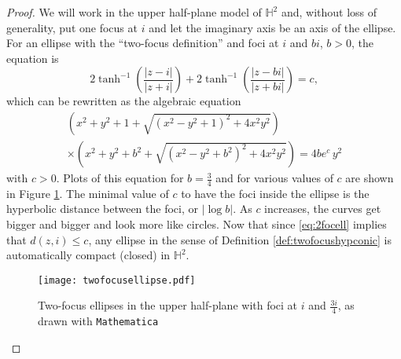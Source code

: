 \documentclass[12pt]{amsart}
\theoremstyle{definition}
\begin{document}
\begin{proof}
We will work in the upper half-plane model of ${\mathbb H}^2$ and, without
loss of generality, put one focus at $i$ and let the imaginary axis be
an axis of the ellipse.  For an ellipse with the ``two-focus
definition'' and foci at $i$ and $bi$, $b>0$, the equation is
\[
2\tanh^{-1}\left({\frac{|z-i|}{|z+i|}}\right) +
2\tanh^{-1}\left({\frac{|z-bi|}{|z+bi|}}\right) = c,
\]
which can be rewritten as the algebraic equation
\begin{multline}
\label{eq:2focell}
\left(x^2+y^2+1+\sqrt{(x^2 - y^2 + 1)^2 + 4 x^2 y^2}\right)\\
\times \left(x^2+y^2+b^2+\sqrt{(x^2 - y^2 + b^2)^2 + 4 x^2 y^2}\right)
=4be^c\,y^2
\end{multline}
with $c>0$.  Plots of this equation for $b= \frac34$ and for
various values of $c$ are shown in Figure \ref{fig:2focell}.
The minimal value of $c$ to have the foci inside the ellipse is
the hyperbolic distance between the foci, or $\vert\log b\vert$.
As $c$ increases, the curves get bigger and bigger and look more like
circles. Now that since \eqref{eq:2focell} implies that $d(z,i)\le c$,
any ellipse in the sense of Definition \ref{def:twofocushypconic} is
automatically compact (closed) in ${\mathbb H}^2$.
\begin{figure}
\begin{center}
\texttt{[image: twofocusellipse.pdf]}
\end{center}
\caption{Two-focus ellipses in the upper half-plane with foci at $i$
  and $\frac{3i}{4}$, as drawn with \texttt{Mathematica}} 
\label{fig:2focell}
\end{figure}


\end{proof}
\end{document}
